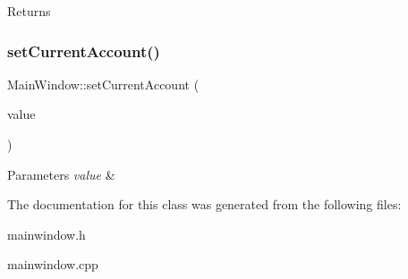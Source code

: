 \begin{DoxyReturn}{Returns}

\end{DoxyReturn}
\mbox{\label{class_main_window_ab57c61a8a7c714901be44d6733f86396}} 
\subsubsection{\texorpdfstring{set\+Current\+Account()}{setCurrentAccount()}}
{\footnotesize\ttfamily Main\+Window\+::set\+Current\+Account (\begin{DoxyParamCaption}\item[{const Q\+String \&}]{value }\end{DoxyParamCaption})}


\begin{DoxyParams}{Parameters}
{\em value} & \\
\hline
\end{DoxyParams}


The documentation for this class was generated from the following files\+:\begin{DoxyCompactItemize}
\item 
mainwindow.\+h\item 
mainwindow.\+cpp\end{DoxyCompactItemize}
